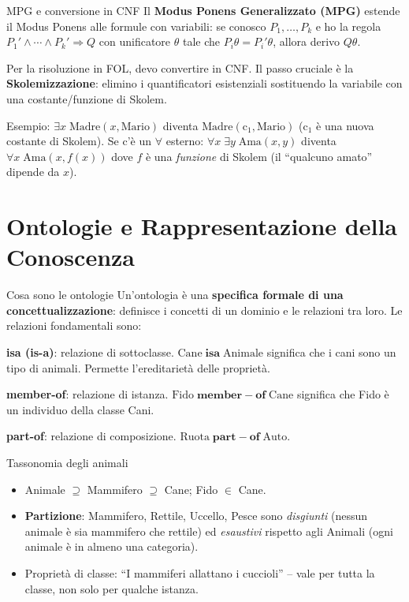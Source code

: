 \documentclass[12pt,a4paper]{article}
\begin{document}
\begin{narrativo}{MPG e conversione in CNF}
Il \textbf{Modus Ponens Generalizzato (MPG)} estende il Modus Ponens alle formule con variabili: se conosco $P_1, \ldots, P_k$ e ho la regola $P_1' \land \cdots \land P_k' \Rightarrow Q$ con unificatore $\theta$ tale che $P_i\theta = P_i'\theta$, allora derivo $Q\theta$.

Per la risoluzione in FOL, devo convertire in CNF. Il passo cruciale è la \textbf{Skolemizzazione}: elimino i quantificatori esistenziali sostituendo la variabile con una costante/funzione di Skolem.

Esempio: $\exists x\; \text{Madre}(x, \text{Mario})$ diventa $\text{Madre}(\text{c}_1, \text{Mario})$ (c$_1$ è una nuova costante di Skolem). Se c'è un $\forall$ esterno: $\forall x\; \exists y\; \text{Ama}(x,y)$ diventa $\forall x\; \text{Ama}(x, f(x))$ dove $f$ è una \emph{funzione} di Skolem (il ``qualcuno amato'' dipende da $x$).
\end{narrativo}

\section{Ontologie e Rappresentazione della Conoscenza}

\begin{narrativo}{Cosa sono le ontologie}
Un'ontologia è una \textbf{specifica formale di una concettualizzazione}: definisce i concetti di un dominio e le relazioni tra loro. Le relazioni fondamentali sono:

\textbf{isa (is-a)}: relazione di sottoclasse. $\text{Cane} \; \mathbf{isa} \; \text{Animale}$ significa che i cani sono un tipo di animali. Permette l'ereditarietà delle proprietà.

\textbf{member-of}: relazione di istanza. $\text{Fido} \; \mathbf{member-of} \; \text{Cane}$ significa che Fido è un individuo della classe Cani.

\textbf{part-of}: relazione di composizione. $\text{Ruota} \; \mathbf{part-of} \; \text{Auto}$.
\end{narrativo}

\begin{esempio}{Tassonomia degli animali}
\begin{itemize}[noitemsep]
  \item Animale $\supseteq$ Mammifero $\supseteq$ Cane; Fido $\in$ Cane.
  \item \textbf{Partizione}: Mammifero, Rettile, Uccello, Pesce sono \emph{disgiunti} (nessun animale è sia mammifero che rettile) ed \emph{esaustivi} rispetto agli Animali (ogni animale è in almeno una categoria).
  \item Proprietà di classe: ``I mammiferi allattano i cuccioli'' -- vale per tutta la classe, non solo per qualche istanza.
\end{itemize}
\end{esempio}
\end{document}
